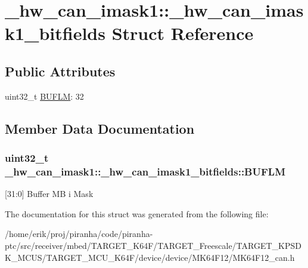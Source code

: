\hypertarget{struct__hw__can__imask1_1_1__hw__can__imask1__bitfields}{}\section{\+\_\+hw\+\_\+can\+\_\+imask1\+:\+:\+\_\+hw\+\_\+can\+\_\+imask1\+\_\+bitfields Struct Reference}
\label{struct__hw__can__imask1_1_1__hw__can__imask1__bitfields}
\subsection*{Public Attributes}
\begin{DoxyCompactItemize}
\item 
uint32\+\_\+t \hyperlink{struct__hw__can__imask1_1_1__hw__can__imask1__bitfields_a90c99e0484cd04fbad87cfb907761097}{B\+U\+F\+LM}\+: 32
\end{DoxyCompactItemize}


\subsection{Member Data Documentation}
\subsubsection[{\texorpdfstring{B\+U\+F\+LM}{BUFLM}}]{\setlength{\rightskip}{0pt plus 5cm}uint32\+\_\+t \+\_\+hw\+\_\+can\+\_\+imask1\+::\+\_\+hw\+\_\+can\+\_\+imask1\+\_\+bitfields\+::\+B\+U\+F\+LM}\hypertarget{struct__hw__can__imask1_1_1__hw__can__imask1__bitfields_a90c99e0484cd04fbad87cfb907761097}{}\label{struct__hw__can__imask1_1_1__hw__can__imask1__bitfields_a90c99e0484cd04fbad87cfb907761097}
\mbox{[}31\+:0\mbox{]} Buffer MB i Mask 

The documentation for this struct was generated from the following file\+:\begin{DoxyCompactItemize}
\item 
/home/erik/proj/piranha/code/piranha-\/ptc/src/receiver/mbed/\+T\+A\+R\+G\+E\+T\+\_\+\+K64\+F/\+T\+A\+R\+G\+E\+T\+\_\+\+Freescale/\+T\+A\+R\+G\+E\+T\+\_\+\+K\+P\+S\+D\+K\+\_\+\+M\+C\+U\+S/\+T\+A\+R\+G\+E\+T\+\_\+\+M\+C\+U\+\_\+\+K64\+F/device/device/\+M\+K64\+F12/M\+K64\+F12\+\_\+can.\+h\end{DoxyCompactItemize}

